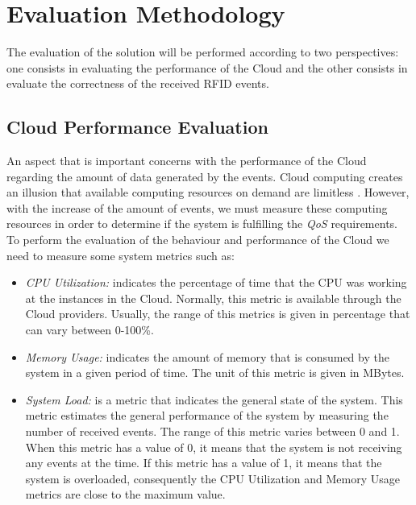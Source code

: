 \section{Evaluation Methodology}
\label{sec:evaluation}
The evaluation of the solution will be performed according to two perspectives: one consists in
evaluating the performance of the Cloud and the other consists in evaluate the correctness of
the received RFID events.

\subsection{Cloud Performance Evaluation}
\label{subs:cloud_performance_evaluation}
An aspect that is important concerns with the performance of the Cloud regarding the amount
of data generated by the events. Cloud computing creates an illusion that available computing
resources on demand are limitless \cite{armbrust2009m}. However, with the increase of the amount of
events, we must measure these computing resources in order to determine if the system is fulfilling
the \textit{QoS} requirements. To perform the evaluation of the behaviour and performance of the Cloud
we need to measure some system metrics such as:
\begin{itemize}
  \item \textit{CPU Utilization:} indicates the percentage of time that the CPU was working at
  the instances in the Cloud. Normally, this metric is available through the Cloud providers.
  Usually, the range of this metrics is given in percentage that can vary between 0-100\%.
  \item \textit{Memory Usage:} indicates the amount of memory that is consumed by the system in a
  given period of time. The unit of this metric is given in MBytes.
  \item \textit{System Load:} is a metric that indicates the general state of the system.
  This metric estimates the general performance of the system by measuring the number of received events.
  The range of this metric varies between 0 and 1. When this metric has a value of 0, it means that the
  system is not receiving any events at the time. If this metric has a value of 1, it means that the system
  is overloaded, consequently the CPU Utilization and Memory Usage metrics are close to the maximum value.
\end{itemize}
